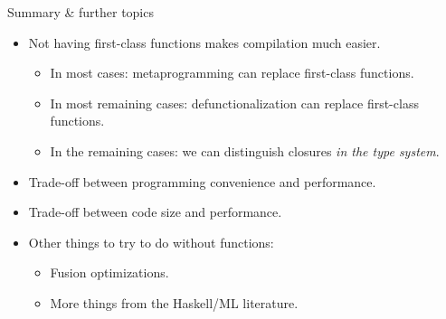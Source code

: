 \documentclass[dvipsnames,aspectratio=169]{beamer}
\theoremstyle{remark}
\begin{document}
\begin{frame}{Summary \& further topics}

\begin{itemize}
\item Not having first-class functions makes compilation much easier.
  \begin{itemize}
  \item In most cases: metaprogramming can replace first-class functions.
  \item In most remaining cases: defunctionalization can replace first-class functions.
  \item In the remaining cases: we can distinguish closures \emph{in the type system}.
  \end{itemize}
  \vspace{1em}
\item Trade-off between programming convenience and performance.
  \vspace{1em}
\item Trade-off between code size and performance.
  \vspace{1em}
\item Other things to try to do without functions:
  \begin{itemize}
  \item Fusion optimizations.
  \item More things from the Haskell/ML literature.
  \end{itemize}
\end{itemize}

\end{frame}
\end{document}
